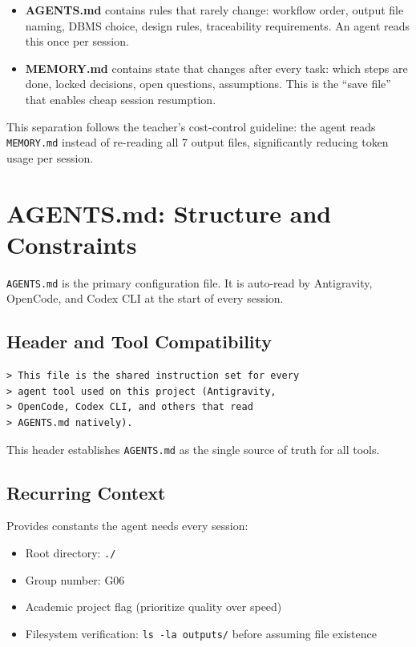 \documentclass[12pt,a4paper]{article}
\begin{document}
\begin{itemize}
    \item \textbf{AGENTS.md} contains rules that rarely change: workflow order, output file naming, DBMS choice, design rules, traceability requirements. An agent reads this once per session.
    \item \textbf{MEMORY.md} contains state that changes after every task: which steps are done, locked decisions, open questions, assumptions. This is the ``save file'' that enables cheap session resumption.
\end{itemize}

This separation follows the teacher's cost-control guideline: the agent reads \texttt{MEMORY.md} instead of re-reading all 7 output files, significantly reducing token usage per session.

\section{AGENTS.md: Structure and Constraints}

\texttt{AGENTS.md} is the primary configuration file. It is auto-read by Antigravity, OpenCode, and Codex CLI at the start of every session.

\subsection{Header and Tool Compatibility}

\begin{lstlisting}
> This file is the shared instruction set for every
> agent tool used on this project (Antigravity,
> OpenCode, Codex CLI, and others that read
> AGENTS.md natively).
\end{lstlisting}

This header establishes \texttt{AGENTS.md} as the single source of truth for all tools.

\subsection{Recurring Context}

Provides constants the agent needs every session:
\begin{itemize}
    \item Root directory: \texttt{./}
    \item Group number: G06
    \item Academic project flag (prioritize quality over speed)
    \item Filesystem verification: \texttt{ls -la outputs/} before assuming file existence
\end{itemize}
\end{document}
